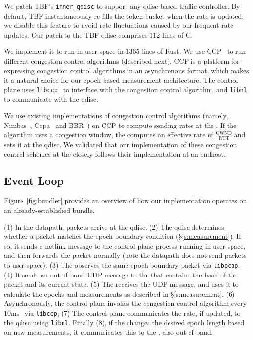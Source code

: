 We patch TBF's \texttt{inner\_qdisc} to support any qdisc-based traffic controller.
By default, TBF instantaneously re-fills the token bucket when the rate is updated; we disable this feature to avoid rate fluctuations caused by our frequent rate updates. 
Our patch to the TBF qdisc comprises $112$ lines of C.

 We implement it to run in user-space in $1365$ lines of Rust.
We use CCP~\cite{ccp} to run different congestion control algorithms (described next). 
CCP is a platform for expressing congestion control algorithms in an asynchronous format, which makes it a natural choice for our epoch-based measurement architecture. 
The control plane uses \texttt{libccp}~\cite{ccp} to interface with the congestion control algorithm, and  \texttt{libnl} to communicate with the qdisc.

 We use existing implementations of congestion control algorithms (namely, Nimbus~\cite{nimbus-arxiv}, Copa~\cite{copa} and BBR~\cite{bbr}) on CCP to compute sending rates at the \inbox.  If the algorithm uses a congestion window, the \inbox computes an effective rate of $\frac{\text{CWND}}{\text{RTT}}$ and sets it at the qdisc. 
We validated that our implementation of these congestion control schemes at the \inbox closely follows their implementation at an endhost.


\subsection{\name Event Loop}\label{s:impl:loop}
Figure~\ref{fig:bundler} provides an overview of how our \name implementation operates on an already-established bundle. 

(1) In the datapath, packets arrive at the \inbox qdisc.
(2) The qdisc determines whether a packet matches the epoch boundary condition (\S\ref{s:measurement}). 
If so, it sends a netlink message to the control plane process running in user-space, and then forwards the packet normally (note the datapath does not send packets to user-space). 
(3) The \outbox observes the same epoch boundary packet via \texttt{libpcap}.
(4) It sends an out-of-band UDP message to the \inbox that contains the hash of the packet and its current state. 
(5) The \inbox receives the UDP message, and uses it to calculate the epochs and measurements as described 
in \S\ref{s:measurement}. 
(6) Asynchronously, the \inbox control plane invokes the congestion control algorithm every $10$ms~\cite{ccp}
via \texttt{libccp},
(7) The \inbox control plane communicates the rate, if updated, to the qdisc
using \texttt{libnl}. 
Finally (8), if the \inbox changes the desired epoch length based on new measurements, it communicates this to the \outbox, also out-of-band.
